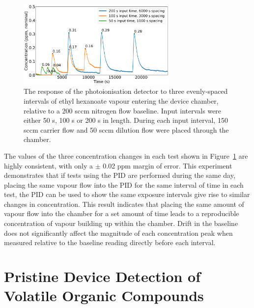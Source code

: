 \documentclass[
  a4paper,
]{scrbook}
\begin{document}
\begin{figure}

{\centering \includegraphics[width=0.7\textwidth,height=\textheight]{figures/ch9/input_time_comparison_PID.png}

}

\caption[The response of the photoionisation detector to three
evenly-spaced intervals of ethyl hexanoate vapour entering the device
chamber, relative to a 200 sccm nitrogen flow
baseline.]{\label{fig-concentration-comparison}The response of the
photoionisation detector to three evenly-spaced intervals of ethyl
hexanoate vapour entering the device chamber, relative to a 200 sccm
nitrogen flow baseline. Input intervals were either 50 s, 100 s or 200 s
in length. During each input interval, 150 sccm carrier flow and 50 sccm
dilution flow were placed through the chamber.}

\end{figure}

The values of the three concentration changes in each test shown in
Figure~\ref{fig-concentration-comparison} are highly consistent, with
only a \(\pm\) 0.02 ppm margin of error. This experiment demonstrates
that if tests using the PID are performed during the same day, placing
the same vapour flow into the PID for the same interval of time in each
test, the PID can be used to show the same exposure intervals give rise
to similar changes in concentration. This result indicates that placing
the same amount of vapour flow into the chamber for a set amount of time
leads to a reproducible concentration of vapour building up within the
chamber. Drift in the baseline does not significantly affect the
magnitude of each concentration peak when measured relative to the
baseline reading directly before each interval.

\hypertarget{sec-pristine-EtHex}{%
\section{Pristine Device Detection of Volatile Organic
Compounds}\label{sec-pristine-EtHex}}
\end{document}

